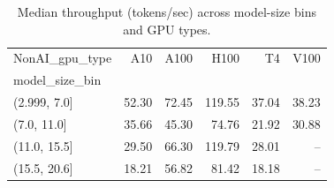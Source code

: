 \begin{table}[t]
\centering
\caption{Median throughput (tokens/sec) across model-size bins and GPU types.}
\label{tab:ai_nonai_median_throughput}
\begin{tabular}{lrrrrr}
\toprule
NonAI_gpu_type & A10 & A100 & H100 & T4 & V100 \\
model_size_bin &  &  &  &  &  \\
\midrule
(2.999, 7.0] & 52.30 & 72.45 & 119.55 & 37.04 & 38.23 \\
(7.0, 11.0] & 35.66 & 45.30 & 74.76 & 21.92 & 30.88 \\
(11.0, 15.5] & 29.50 & 66.30 & 119.79 & 28.01 & -- \\
(15.5, 20.6] & 18.21 & 56.82 & 81.42 & 18.18 & -- \\
\bottomrule
\end{tabular}

\end{table}
